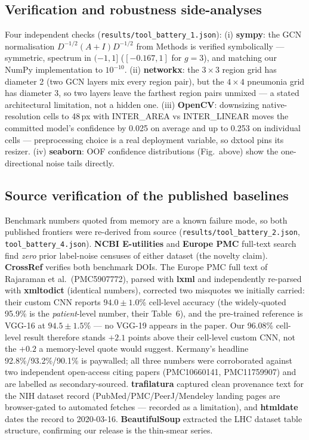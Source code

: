 \documentclass[11pt]{article}
\theoremstyle{definition}
\begin{document}
\subsection{Verification and robustness side-analyses}
Four independent checks (\texttt{results/tool\_battery\_1.json}):
(i) \textbf{sympy}: the GCN normalisation $D^{-1/2}(A{+}I)D^{-1/2}$ from
Methods is verified symbolically --- symmetric, spectrum in $({-1},1]$
($[-0.167,1]$ for $g{=}3$), and matching our NumPy implementation to
$10^{-10}$. (ii) \textbf{networkx}: the $3{\times}3$ region grid has
diameter 2 (two GCN layers mix every region pair), but the $4{\times}4$
pneumonia grid has diameter 3, so two layers leave the farthest region
pairs unmixed --- a stated architectural limitation, not a hidden one.
(iii) \textbf{OpenCV}: downsizing native-resolution cells to 48\,px with
INTER\_AREA vs INTER\_LINEAR moves the committed model's confidence by
0.025 on average and up to 0.253 on individual cells --- preprocessing
choice is a real deployment variable, so dxtool pins its resizer.
(iv) \textbf{seaborn}: OOF confidence distributions (Fig.~above) show
the one-directional noise tails directly.
\subsection{Source verification of the published baselines}
Benchmark numbers quoted from memory are a known failure mode, so both
published frontiers were re-derived from source
(\texttt{results/tool\_battery\_2.json}, \texttt{tool\_battery\_4.json}).
\textbf{NCBI E-utilities} and \textbf{Europe PMC} full-text search find
\emph{zero} prior label-noise censuses of either dataset (the novelty
claim). \textbf{CrossRef} verifies both benchmark DOIs. The Europe PMC
full text of Rajaraman et al.\ (PMC5907772), parsed with \textbf{lxml}
and independently re-parsed with \textbf{xmltodict} (identical numbers),
corrected two misquotes we initially carried: their custom CNN reports
$94.0 \pm 1.0$\% cell-level accuracy (the widely-quoted 95.9\% is the
\emph{patient}-level number, their Table~6), and the pre-trained
reference is VGG-16 at $94.5 \pm 1.5$\% --- no VGG-19 appears in the
paper. Our 96.08\% cell-level result therefore stands $+2.1$ points
above their cell-level custom CNN, not the $+0.2$ a memory-level quote
would suggest. Kermany's headline 92.8\%/93.2\%/90.1\% is paywalled;
all three numbers were corroborated against two independent open-access
citing papers (PMC10660141, PMC11759907) and are labelled as
secondary-sourced. \textbf{trafilatura} captured clean provenance text
for the NIH dataset record (PubMed/PMC/PeerJ/Mendeley landing pages are
browser-gated to automated fetches --- recorded as a limitation), and
\textbf{htmldate} dates the record to 2020-03-16. \textbf{BeautifulSoup}
extracted the LHC dataset table structure, confirming our release is the
thin-smear series.
\end{document}
